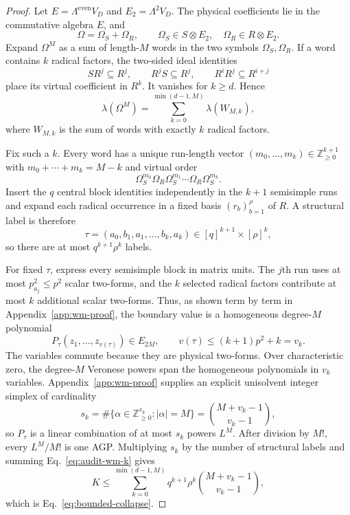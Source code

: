 \documentclass[aps,pra,reprint,superscriptaddress,nofootinbib,longbibliography,showkeys]{revtex4-2}
\theoremstyle{definition}
\begin{document}
\begin{proof}
Let $E=\Lambda^{\mathrm{even}}V_D$ and
$E_2=\Lambda^2V_D$.  The physical coefficients lie in the commutative algebra
$E$, and
\begin{equation}
\Omega=\Omega_S+\Omega_R,
\qquad
\Omega_S\in S\otimes E_2,\quad
\Omega_R\in R\otimes E_2.
\end{equation}
Expand $\Omega^M$ as a sum of length-$M$ words in the two symbols
$\Omega_S,\Omega_R$.  If a word contains $k$ radical factors, the two-sided
ideal identities
\begin{equation}
SR^j\subseteq R^j,\qquad R^jS\subseteq R^j,\qquad
R^iR^j\subseteq R^{i+j}
\end{equation}
place its virtual coefficient in $R^k$.  It vanishes for $k\ge d$.  Hence
\begin{equation}
\lambda(\Omega^M)=
\sum_{k=0}^{\min(d-1,M)}\lambda(W_{M,k}),
\label{eq:audit-wm-k}
\end{equation}
where $W_{M,k}$ is the sum of words with exactly $k$ radical factors.

Fix such a $k$.  Every word has a unique run-length vector
$(m_0,\ldots,m_k)\in\mathbb Z_{\ge0}^{k+1}$ with
$m_0+\cdots+m_k=M-k$ and virtual order
\begin{equation}
\Omega_S^{m_0}\Omega_R\Omega_S^{m_1}\cdots
\Omega_R\Omega_S^{m_k}.
\end{equation}
Insert the $q$ central block identities independently in the $k+1$
semisimple runs and expand each radical occurrence in a fixed basis
$(r_b)_{b=1}^{\rho}$ of $R$.  A structural label is therefore
\begin{equation}
\tau=(a_0,b_1,a_1,\ldots,b_k,a_k)
\in[q]^{k+1}\times[\rho]^k,
\end{equation}
so there are at most $q^{k+1}\rho^k$ labels.

For fixed $\tau$, express every semisimple block in matrix units.  The
$j$th run uses at most $p_{a_j}^2\le p^2$ scalar two-forms, and the $k$
selected radical factors contribute at most $k$ additional scalar two-forms.
Thus, as shown term by term in Appendix~\ref{app:wm-proof}, the boundary value
is a homogeneous degree-$M$ polynomial
\begin{equation}
P_\tau(z_1,\ldots,z_{v(\tau)})\in E_{2M},
\qquad
v(\tau)\le(k+1)p^2+k=v_k.
\label{eq:audit-wm-poly}
\end{equation}
The variables commute because they are physical two-forms.  Over
characteristic zero, the degree-$M$ Veronese powers span the homogeneous
polynomials in $v_k$ variables.  Appendix~\ref{app:wm-proof} supplies an
explicit unisolvent integer simplex of cardinality
\begin{equation}
s_k=\#\{\alpha\in\mathbb Z_{\ge0}^{v_k}:|\alpha|=M\}
=\binom{M+v_k-1}{v_k-1},
\end{equation}
so $P_\tau$ is a linear combination of at most $s_k$ powers $L^M$.  After
division by $M!$, every $L^M/M!$ is one AGP.  Multiplying $s_k$ by the number
of structural labels and summing Eq.~\eqref{eq:audit-wm-k} gives
\begin{equation}
K\le\sum_{k=0}^{\min(d-1,M)}q^{k+1}\rho^k
\binom{M+v_k-1}{v_k-1},
\end{equation}
which is Eq.~\eqref{eq:bounded-collapse}.


\end{proof}
\end{document}
